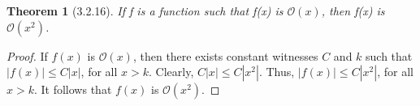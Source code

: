 \documentclass[a4paper, 12pt]{article}
\theoremstyle{plain}
\newtheorem*{theorem*}{Theorem}
\begin{document}
	
	\begin{theorem*}[3.2.16]
		If f is a function such that f(x) is $\mathcal{O}(x)$, then f(x) is $\mathcal{O}(x^{2})$.
	\end{theorem*}
	
	\begin{proof}
		If $f(x)$ is $\mathcal{O}(x)$, then there exists constant witnesses $C$ and $k$ such that $|f(x)| \le C|x|$, for all $x > k$. Clearly, $C|x| \le C|x^{2}|$. Thus, $|f(x)| \le C|x^{2}|$, for all $x > k$. It follows that $f(x)$ is $\mathcal{O}(x^{2})$.
	\end{proof}
\end{document}

